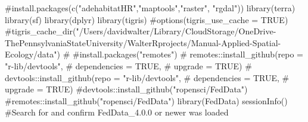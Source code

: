 \documentclass[
  letterpaper,
]{book}
\newenvironment{Shaded}{\begin{snugshade}}{\end{snugshade}}
\newcommand{\CommentTok}[1]{\textcolor[rgb]{0.37,0.37,0.37}{#1}}
\newcommand{\FunctionTok}[1]{\textcolor[rgb]{0.28,0.35,0.67}{#1}}
\newcommand{\NormalTok}[1]{\textcolor[rgb]{0.00,0.23,0.31}{#1}}
\begin{document}
\begin{Shaded}
\begin{Highlighting}[]
\CommentTok{\#install.packages(c("adehabitatHR","maptools","raster", "rgdal"))}
\FunctionTok{library}\NormalTok{(terra)}
\FunctionTok{library}\NormalTok{(sf)}
\FunctionTok{library}\NormalTok{(dplyr)}
\FunctionTok{library}\NormalTok{(tigris)}
\CommentTok{\#options(tigris\_use\_cache = TRUE)}
\CommentTok{\#tigris\_cache\_dir("/Users/davidwalter/Library/CloudStorage/OneDrive{-}ThePennsylvaniaStateUniversity/WalterRprojects/Manual{-}Applied{-}Spatial{-}Ecology/data")}
\CommentTok{\#\textquotesingle{}}
\CommentTok{\#install.packages("remotes")}
\CommentTok{\# remotes::install\_github(repo = "r{-}lib/devtools",}
\CommentTok{\#                               dependencies = TRUE,}
\CommentTok{\#                               upgrade = TRUE)}
\CommentTok{\# devtools::install\_github(repo = "r{-}lib/devtools",}
\CommentTok{\#                            dependencies = TRUE,}
\CommentTok{\#                            upgrade = TRUE)}
\CommentTok{\#devtools::install\_github("ropensci/FedData")}
\CommentTok{\#remotes::install\_github("ropensci/FedData")}
\FunctionTok{library}\NormalTok{(FedData)}
\FunctionTok{sessionInfo}\NormalTok{() }\CommentTok{\#Search for and confirm FedData\_4.0.0 or newer was loaded}
\end{Highlighting}
\end{Shaded}
\end{document}
